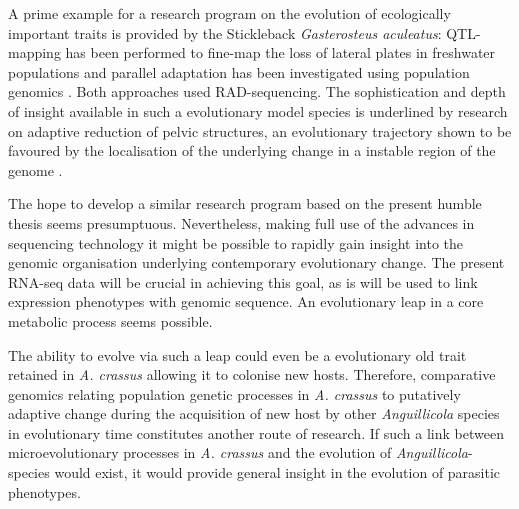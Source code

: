 A prime example for a research program on the evolution of
ecologically important traits is provided by the Stickleback
\textit{Gasterosteus aculeatus}: QTL-mapping has been performed to
fine-map the loss of lateral plates in freshwater populations
\cite{pmid18852878} and parallel adaptation has been investigated
using population genomics \cite{pmid20195501}. Both approaches used
RAD-sequencing. The sophistication and depth of insight available in
such a evolutionary model species is underlined by research on
adaptive reduction of pelvic structures, an evolutionary trajectory
shown to be favoured by the localisation of the underlying change in a
instable region of the genome \cite{pmid20007865}.

The hope to develop a similar research program based on the present
humble thesis seems presumptuous. Nevertheless, making full use of the
advances in sequencing technology it might be possible to rapidly gain
insight into the genomic organisation underlying contemporary
evolutionary change. The present RNA-seq data will be crucial in
achieving this goal, as is will be used to link expression phenotypes
with genomic sequence. An evolutionary leap in a core metabolic
process seems possible.

The ability to evolve via such a leap could even be a evolutionary old
trait retained in \textit{A. crassus} allowing it to colonise new
hosts. Therefore, comparative genomics relating population genetic
processes in \textit{A. crassus} to putatively adaptive change during
the acquisition of new host by other \textit{Anguillicola} species in
evolutionary time constitutes another route of research. If such a link
between microevolutionary processes in \textit{A. crassus} and the
evolution of \textit{Anguillicola}-species would exist, it would
provide general insight in the evolution of parasitic phenotypes.






